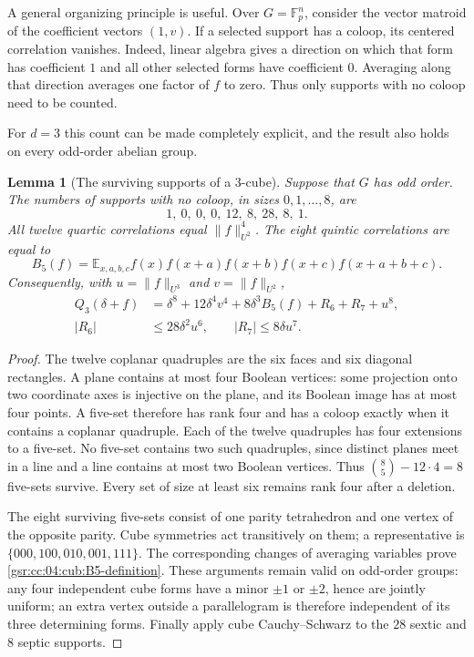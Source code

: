 \documentclass[11pt,letterpaper]{article}
\numberwithin{equation}{section}
\newtheorem{lemma}[theorem]{Lemma}
\theoremstyle{definition}
\theoremstyle{remark}
\newcommand{\1}{\mathbf 1}
\begin{document}
A general organizing principle is useful. Over $G=\mathbb F_p^n$, consider
the vector matroid of the coefficient vectors $(1,v)$. If a selected support
has a coloop, its centered correlation vanishes. Indeed, linear algebra gives
a direction on which that form has coefficient $1$ and all other selected
forms have coefficient $0$. Averaging along that direction averages one
factor of $f$ to zero. Thus only supports with no coloop need to be counted.

For $d=3$ this count can be made completely explicit, and the result also
holds on every odd-order abelian group.

\begin{lemma}[The surviving supports of a $3$-cube]
\label{gsr:cc:04:cub:supports}
Suppose that \(G\) has odd order.  The numbers of supports with no coloop,
in sizes $0,1,\ldots,8$, are
\[
        1,\ 0,\ 0,\ 0,\ 12,\ 8,\ 28,\ 8,\ 1.
\]
All twelve quartic correlations equal $\|f\|_{U^2}^4$. The eight quintic
correlations are equal to
\begin{equation}
 B_5(f)=\mathbb E_{x,a,b,c}
 f(x)f(x+a)f(x+b)f(x+c)f(x+a+b+c).
 \label{gsr:cc:04:cub:B5-definition}
\end{equation}
Consequently, with $u=\|f\|_{U^3}$ and $v=\|f\|_{U^2}$,
\begin{align}
 Q_3(\delta+f)
 &=\delta^8+12\delta^4v^4+8\delta^3B_5(f)+R_6+R_7+u^8,
 \label{gsr:cc:04:cub:exact-cubic-expansion}\\
 |R_6|&\leq28\delta^2u^6,\qquad |R_7|\leq8\delta u^7.
 \label{gsr:cc:04:cub:remainder67}
\end{align}
\end{lemma}

\begin{proof}
The twelve coplanar quadruples are the six faces and six diagonal
rectangles. A plane contains at most four Boolean vertices: some projection
onto two coordinate axes is injective on the plane, and its Boolean image
has at most four points. A five-set therefore has rank four and has a
coloop exactly when it contains a coplanar quadruple. Each of the twelve
quadruples has four extensions to a five-set. No five-set contains two such
quadruples, since distinct planes meet in a line and a line contains at most
two Boolean vertices. Thus $\binom85-12\cdot4=8$ five-sets survive. Every
set of size at least six remains rank four after a deletion.

The eight surviving five-sets consist of one parity tetrahedron and one
vertex of the opposite parity. Cube symmetries act transitively on them;
a representative is $\{000,100,010,001,111\}$. The corresponding changes of
averaging variables prove \eqref{gsr:cc:04:cub:B5-definition}. These arguments remain
valid on odd-order groups: any four independent cube forms have a minor
$\pm1$ or $\pm2$, hence are jointly uniform; an extra vertex outside a
parallelogram is therefore independent of its three determining forms.
Finally apply cube Cauchy--Schwarz to the $28$ sextic and $8$ septic supports.
\end{proof}
\end{document}
